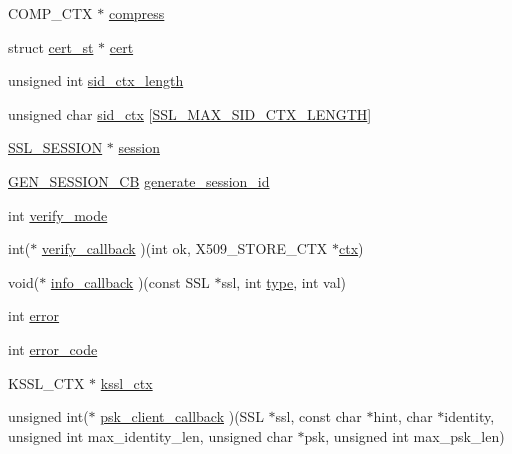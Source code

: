 \begin{DoxyCompactItemize}
\item 
C\-O\-M\-P\-\_\-\-C\-T\-X $\ast$ \hyperlink{structssl__st_a62a49a9330502d045bbf6376c820225c}{compress}
\item 
struct \hyperlink{structcert__st}{cert\-\_\-st} $\ast$ \hyperlink{structssl__st_a335d212e807952601a0eabf4dfd978eb}{cert}
\item 
unsigned int \hyperlink{structssl__st_a7b63f375f11b5232a5dff69e26f6a438}{sid\-\_\-ctx\-\_\-length}
\item 
unsigned char \hyperlink{structssl__st_a486ddbf462473285440234c69568b9ce}{sid\-\_\-ctx} \mbox{[}\hyperlink{ssl_8h_a5cef804495c6414283f4f29d4cea0dd0}{S\-S\-L\-\_\-\-M\-A\-X\-\_\-\-S\-I\-D\-\_\-\-C\-T\-X\-\_\-\-L\-E\-N\-G\-T\-H}\mbox{]}
\item 
\hyperlink{ssl_8h_a8dd6b81bbcb1b2d769235c37779d2a94}{S\-S\-L\-\_\-\-S\-E\-S\-S\-I\-O\-N} $\ast$ \hyperlink{structssl__st_ae6d956c10b03dd3f4d0a3a132466eb47}{session}
\item 
\hyperlink{ssl_8h_aa01dfe50fd8d7cc799cad6bcf13ccfbe}{G\-E\-N\-\_\-\-S\-E\-S\-S\-I\-O\-N\-\_\-\-C\-B} \hyperlink{structssl__st_aa315242df1667bfb185bfcaa5b7ca86f}{generate\-\_\-session\-\_\-id}
\item 
int \hyperlink{structssl__st_a7592fd603fe469b789f13bdbc55a172e}{verify\-\_\-mode}
\item 
int($\ast$ \hyperlink{structssl__st_a82f95e0f633b3fefa717fc5b04ca81e9}{verify\-\_\-callback} )(int ok, X509\-\_\-\-S\-T\-O\-R\-E\-\_\-\-C\-T\-X $\ast$\hyperlink{structssl__st_a5a3ac76eff749d5d3c9ecf6b1a230497}{ctx})
\item 
void($\ast$ \hyperlink{structssl__st_af70e998b1204131dc31d6cc12dc1ce8f}{info\-\_\-callback} )(const S\-S\-L $\ast$ssl, int \hyperlink{structssl__st_a5d2a229f22c169bd5eecefd9f017e089}{type}, int val)
\item 
int \hyperlink{structssl__st_aca7ac14e5548bdd96990fa1d12aaef02}{error}
\item 
int \hyperlink{structssl__st_a6a6c337340e6b5986ca6a1381838c9ae}{error\-\_\-code}
\item 
K\-S\-S\-L\-\_\-\-C\-T\-X $\ast$ \hyperlink{structssl__st_a1b2e26d71535a556a65c577216336e31}{kssl\-\_\-ctx}
\item 
unsigned int($\ast$ \hyperlink{structssl__st_ad72e738d0c860b10862bf13009023730}{psk\-\_\-client\-\_\-callback} )(S\-S\-L $\ast$ssl, const char $\ast$hint, char $\ast$identity, unsigned int max\-\_\-identity\-\_\-len, unsigned char $\ast$psk, unsigned int max\-\_\-psk\-\_\-len)
\item 

\end{DoxyCompactItemize}
